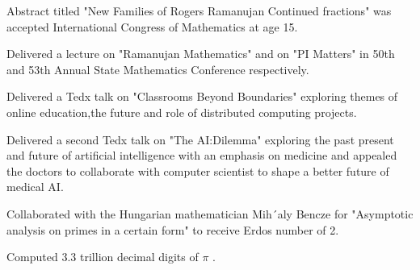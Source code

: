 \documentclass[]{deedy-resume-openfont}
\begin{document}
\vspace{\topsep} %
\begin{tightemize}\item Abstract titled "New Families of Rogers Ramanujan Continued fractions" was accepted International Congress of Mathematics at age 15.
\end{tightemize}
\sectionsep

\begin{tightemize}\item Delivered a lecture on "Ramanujan Mathematics" and on "PI Matters" in 50th and 53th Annual  State Mathematics Conference respectively.
\end{tightemize}
\sectionsep

\begin{tightemize}
\item Delivered a Tedx talk on "Classrooms Beyond Boundaries" exploring themes of online education,the future and role of distributed computing projects.

\item Delivered a second Tedx talk on "The AI:Dilemma" exploring the past present and future of artificial intelligence with an emphasis on medicine and appealed the doctors to collaborate with computer scientist to shape a better future of medical AI.


\end{tightemize}
\sectionsep

\begin{tightemize}
\item Collaborated with the Hungarian mathematician Mih´aly Bencze for "Asymptotic analysis on primes in a certain form" to receive Erdos number of 2.

\end{tightemize}
\sectionsep

\begin{tightemize}
\item Computed $3.3$ trillion decimal digits of $\pi$ .
\end{tightemize}
\sectionsep
\end{document}
